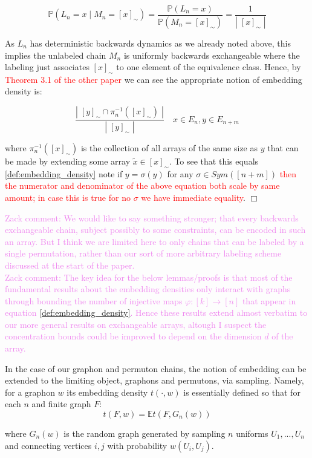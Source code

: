 \documentclass[11pt,oneside,reqno]{article}
\theoremstyle{plain}
\theoremstyle{definition}
\numberwithin{equation}{section}
\renewcommand{\phi}{\varphi}
\newcommand{\E}{\mathbb{E}}
\renewcommand{\P}{\mathbb{P}}
\newcommand{\red}{\textcolor{red}}
\newcommand{\tx}{\tilde{x}}
\newcommand{\zack}[1]{\textcolor{Violet}{Zack comment: #1}}
\begin{document}
\[\P(L_n = x \; |\; M_n = [x]_\sim) = \frac{\P(L_n = x)}{\P(M_n = [x]_\sim) }=\frac{1}{| \; [x]_\sim \; |}\]

\noindent As $L_n$ has deterministic backwards dynamics as we already noted above, this implies the unlabeled chain $M_n$ is uniformly backwards exchangeable where the labeling just associates $[x]_\sim$ to one element of the equivalence class. Hence, by \red{Theorem 3.1 of the other paper} we can see the appropriate notion of embedding density is:

\[\frac{| \; [y]_\sim \cap \pi_n^{-1}([x]_\sim) \; |}{|\; [y]_\sim \; |} \quad x \in E_n, y \in E_{n+m}\]

\noindent where $\pi_n^{-1}( [x]_\sim)$ is the collection of all arrays of the same size as $y$ that can be made by extending some array $\tx \in [x]_\sim$. To see that this equals \ref{def:embedding_density} note if $y =\sigma(y)$ for any $\sigma \in Sym([n+m])$ \red{then the numerator and denominator of the above equation both scale by same amount; in case this is true for no $\sigma$ we have immediate equality}.  $\Box$

\zack{We would like to say something stronger; that every backwards exchangeable chain, subject possibly to some constraints, can be encoded in such an array. But I think we are limited here to only chains that can be labeled by a single permutation, rather than our sort of more arbitrary labeling scheme discussed at the start of the paper.}\\



\zack{The key idea for the below lemmas/proofs is that most of the fundamental results about the embedding densities only interact with graphs through bounding the number of injective maps $\phi : [k] \to [n]$ that appear in equation \eqref{def:embedding_density}. Hence these results extend almost verbatim to our more general results on exchangeable arrays, altough I suspect the concentration bounds could be improved to depend on the dimension $d$ of the array.}

\noindent In the case of our graphon and permuton chains, the notion of embedding can be extended to the limiting object, graphons and permutons, via sampling. Namely, for a graphon $w$ its embedding density $t(\cdot, w)$ is essentially defined so that for each $n$ and finite graph $F$:
%
\[t(F, w) = \E t(F, G_n(w))\]

\noindent where $G_n(w)$ is the random graph generated by sampling $n$ uniforms $U_1,..., U_n$ and connecting vertices $i,j$ with probability $w(U_i, U_j)$.
\end{document}
